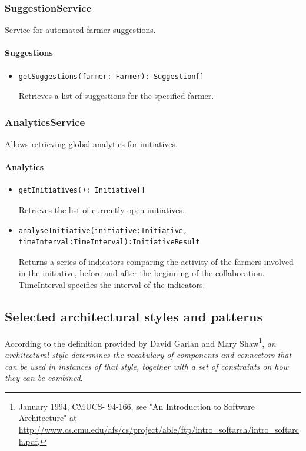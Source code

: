 \documentclass{article}
\begin{document}
\subsubsection{SuggestionService}
Service for automated farmer suggestions.

\paragraph{Suggestions}
\begin{itemize}
\item \begin{verbatim}
getSuggestions(farmer: Farmer): Suggestion[]
\end{verbatim}
Retrieves a list of suggestions for the specified farmer.
\end{itemize}

\subsubsection{AnalyticsService}
Allows retrieving global analytics for initiatives.

\paragraph{Analytics}
\begin{itemize}
\item \begin{verbatim}
getInitiatives(): Initiative[]
\end{verbatim}
Retrieves the list of currently open initiatives.
\item \begin{verbatim}
analyseInitiative(initiative:Initiative, timeInterval:TimeInterval):InitiativeResult
\end{verbatim}
Returns a series of indicators comparing the activity of the farmers involved in the initiative, before and after the beginning of the collaboration. TimeInterval specifies the interval of the indicators.
\end{itemize}

\subsection{Selected architectural styles and patterns}
According to the definition provided by David Garlan and Mary Shaw\footnote{January 1994, CMUCS-
94-166, see "An Introduction to Software Architecture"
at \url{http://www.cs.cmu.edu/afs/cs/project/able/ftp/intro_softarch/intro_softarch.pdf}.}, \textit{an architectural style determines the vocabulary of components and connectors that can be used in instances of that style, together with a set of constraints on how they can be combined}.\\
\end{document}
